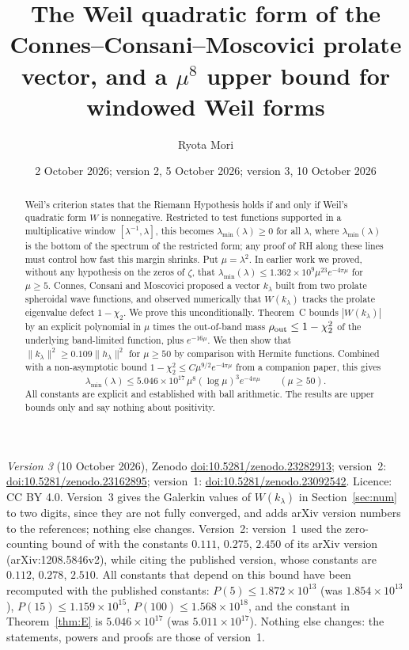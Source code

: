 \documentclass[11pt]{amsart}
\title[The Weil form of the prolate vector]{The Weil quadratic form of the Connes--Consani--Moscovici prolate vector, and a $\mu^8$ upper bound for windowed Weil forms}
\author{Ryota Mori}
\date{2 October 2026; version 2, 5 October 2026; version 3, 10 October 2026}
\newcommand{\doi}[1]{\href{https://doi.org/#1}{doi:#1}}
\theoremstyle{remark}
\numberwithin{equation}{section}
\begin{document}
\begin{abstract}
Weil's criterion states that the Riemann Hypothesis holds if and only if Weil's quadratic form $W$ is nonnegative. Restricted to test functions supported in a multiplicative window $[\lambda^{-1},\lambda]$, this becomes $\lambda_{\min}(\lambda)\ge0$ for all $\lambda$, where $\lambda_{\min}(\lambda)$ is the bottom of the spectrum of the restricted form; any proof of RH along these lines must control how fast this margin shrinks. Put $\mu=\lambda^2$. In earlier work we proved, without any hypothesis on the zeros of $\zeta$, that $\lambda_{\min}(\lambda)\le1.362\times10^9\mu^{23}e^{-4\pi\mu}$ for $\mu\ge5$. Connes, Consani and Moscovici proposed a vector $k_\lambda$ built from two prolate spheroidal wave functions, and observed numerically that $W(k_\lambda)$ tracks the prolate eigenvalue defect $1-\chi_2$. We prove this unconditionally. Theorem~C bounds $|W(k_\lambda)|$ by an explicit polynomial in $\mu$ times the out-of-band mass $\rho_{\rm out}\le1-\chi_2^2$ of the underlying band-limited function, plus $e^{-16\mu}$. We then show that $\|k_\lambda\|^2\ge0.109\|h_\lambda\|^2$ for $\mu\ge50$ by comparison with Hermite functions. Combined with a non-asymptotic bound $1-\chi_2^2\le C\mu^{9/2}e^{-4\pi\mu}$ from a companion paper, this gives
\[
\lambda_{\min}(\lambda)\le5.046\times10^{17}\,\mu^8(\log\mu)^3e^{-4\pi\mu}\qquad(\mu\ge50).
\]
All constants are explicit and established with ball arithmetic. The results are upper bounds only and say nothing about positivity.
\end{abstract}

\maketitle

\begin{sloppypar}
\noindent\textit{Version 3} (10 October 2026), Zenodo \doi{10.5281/zenodo.23282913}; version~2: \doi{10.5281/zenodo.23162895}; version~1: \doi{10.5281/zenodo.23092542}. Licence: CC BY 4.0. Version~3 gives the Galerkin values of $W(k_\lambda)$ in Section~\ref{sec:num} to two digits, since they are not fully converged, and adds arXiv version numbers to the references; nothing else changes. Version~2: version~1 used the zero-counting bound of \cite{Trudgian14} with the constants $0.111$, $0.275$, $2.450$ of its arXiv version (arXiv:1208.5846v2), while citing the published version, whose constants are $0.112$, $0.278$, $2.510$. All constants that depend on this bound have been recomputed with the published constants: $P(5)\le1.872\times10^{13}$ (was $1.854\times10^{13}$), $P(15)\le1.159\times10^{15}$, $P(100)\le1.568\times10^{18}$, and the constant in Theorem~\ref{thm:E} is $5.046\times10^{17}$ (was $5.011\times10^{17}$). Nothing else changes: the statements, powers and proofs are those of version~1.
\end{sloppypar}
\end{document}
